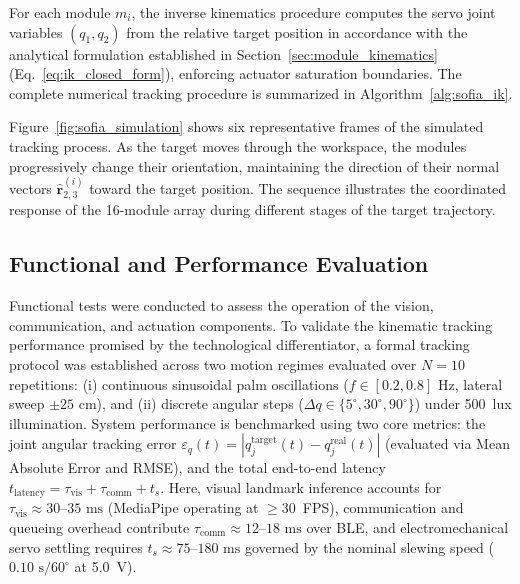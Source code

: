 \documentclass[lettersize,journal]{IEEEtran}
\begin{document}
	For each module $m_i$, the inverse kinematics procedure computes the servo joint variables $(q_1,q_2)$ from the relative target position in accordance with the analytical formulation established in Section~\ref{sec:module_kinematics} (Eq.~\eqref{eq:ik_closed_form}), enforcing actuator saturation boundaries. The complete numerical tracking procedure is summarized in Algorithm~\ref{alg:sofia_ik}.
	
	Figure~\ref{fig:sofia_simulation} shows six representative frames
	of the simulated tracking process. As the target moves through the
	workspace, the modules progressively change their orientation,
	maintaining the direction of their normal vectors
	$\hat{\mathbf{r}}_{2,3}^{(i)}$ toward the target position. The sequence
	illustrates the coordinated response of the 16-module array during
	different stages of the target trajectory.
	
	\subsection{Functional and Performance Evaluation}
	\label{sec:functional_performance}
	
	Functional tests were conducted to assess the operation of the
	vision, communication, and actuation components. To validate the kinematic
	tracking performance promised by the technological differentiator, a formal
	tracking protocol was established across two motion regimes evaluated over
	$N = 10$ repetitions: (i) continuous sinusoidal palm oscillations ($f \in [0.2, 0.8]\text{ Hz}$,
	lateral sweep $\pm 25\text{ cm}$), and (ii) discrete angular steps
	($\Delta q \in \{5^\circ, 30^\circ, 90^\circ\}$) under 500~lux illumination.
	System performance is benchmarked using two core metrics:
	the joint angular tracking error $\varepsilon_q(t) = |q_j^{\text{target}}(t) - q_j^{\text{real}}(t)|$
	(evaluated via Mean Absolute Error and RMSE), and the total end-to-end
	latency $t_{\text{latency}} = \tau_{\text{vis}} + \tau_{\text{comm}} + t_s$.
	Here, visual landmark inference accounts for $\tau_{\text{vis}} \approx 30\text{--}35\text{ ms}$
	(MediaPipe operating at $\ge 30$~FPS), communication and queueing overhead
	contribute $\tau_{\text{comm}} \approx 12\text{--}18\text{ ms}$ over BLE, and
	electromechanical servo settling requires $t_s \approx 75\text{--}180\text{ ms}$
	governed by the nominal slewing speed ($0.10\text{ s}/60^\circ$ at 5.0~V).
	
\end{document}
